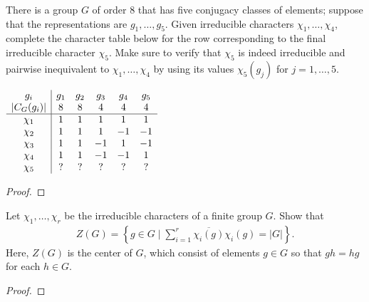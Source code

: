 \documentclass[num=5,duedate=03-10-21,course=Algebra\ II,proflastname=Walton]{hwtemplate}
\begin{document}
\problem[6]
\begin{claim}
	There is a group \(G\) of order \(8\) that has five conjugacy classes of elements; suppose that the representations are \(g_1,\ldots,g_5\). Given irreducible characters \(\chi_1,\ldots,\chi _4\), complete the character table below for the row corresponding to the final irreducible character \(\chi_5\). Make sure to verify that \(\chi_5\) is indeed irreducible and pairwise inequivalent to \(\chi _1,\ldots,\chi _4\) by using its values \(\chi _5(g_j)\) for \(j = 1,\ldots,5\).
		\begin{table}[ht]
			\centering
			\(\begin{array}{c | c c c c c}
			 g_i & g_1 & g_2 & g_3 & g_4 & g_5\\
			 \left| C_G(g_i) \right| & 8 & 8 & 4 & 4 & 4\\
			 \hline
			 \chi_1 & 1 & 1 & 1 & 1 & 1\\
			 \chi_2 & 1 & 1 & 1 & -1 & -1 \\
			 \chi _3 & 1 & 1 & -1 & 1 & -1\\
			 \chi_4 & 1 & 1 & -1 & -1 & 1\\
			 \chi_5 & ? & ? & ? & ? & ?
		 \end{array}\)
		\end{table}
\end{claim}
\begin{proof}
	
\end{proof}
\problem[7]
\begin{claim}
	Let \(\chi_1,\ldots,\chi_r\) be the irreducible characters of a finite group \(G\). Show that
	\begin{align*}
		Z(G) = \left\{g \in G \mid \sum_{i=1}^{r} \overline{\chi_i(g)}\chi_i(g) = \left| G \right|  \right\} .
	\end{align*}
	Here, \(Z(G)\) is the center of \(G\), which consist of elements \(g \in G\) so that \(gh = hg\) for each \(h \in G\).
\end{claim}
\begin{proof}
	
\end{proof}
\end{document}
